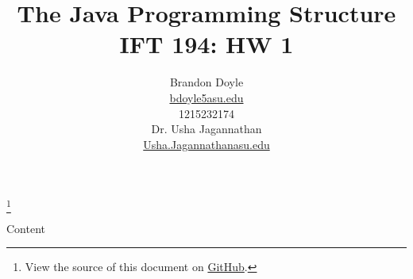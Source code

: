 \documentclass[leqno, 11pt]{article}
\title{\vspace{6ex}The Java Programming Structure\\
  \Large IFT 194: HW 1}
\author{Brandon Doyle\\
\href{mailto:bdoyle@asu.edu}{bdoyle5\at{}asu.edu}\\
1215232174\\[1em]
Dr. Usha Jagannathan\\
\href{mailto:Usha.Jagannathan@asu.edu}{Usha.Jagannathan\at{}asu.edu}}
\newcommand\blfootnote[1]{%
  \begingroup
    \renewcommand\thefootnote{}\footnote{#1}
    \addtocounter{footnote}{-1}
  \endgroup
}
\begin{document}
\begin{titlepage}
\clearpage\maketitle
\thispagestyle{empty}
\end{titlepage}
\tableofcontents
\blfootnote{View the source of this document on \href{https://github.com/bjd2385/IFT_194_labs/blob/master/\jobname.tex}{GitHub}.}
\newpage
Content
\end{document}
